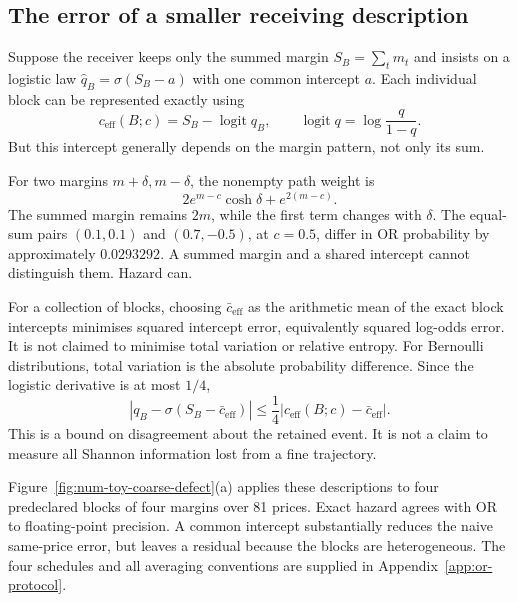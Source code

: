 \subsection{The error of a smaller receiving description}

Suppose the receiver keeps only the summed margin
\(S_B=\sum_tm_t\) and insists on a logistic law
\(\widehat q_B=\sigma(S_B-a)\) with one common intercept \(a\). Each individual block can be represented exactly using
\begin{equation}
 c_{\mathrm{eff}}(B;c)
 =S_B-\operatorname{logit}q_B,\qquad
 \operatorname{logit}q=\log\frac q{1-q}.
 \label{eq:num-toy-running-cost}
\end{equation}
But this intercept generally depends on the margin pattern, not only its sum.

For two margins \(m+\delta,m-\delta\), the nonempty path weight is
\begin{equation}
 2e^{m-c}\cosh\delta+e^{2(m-c)} .
 \label{eq:heterogeneous-pair}
\end{equation}
The summed margin remains \(2m\), while the first term changes with \(\delta\). The equal-sum pairs \((0.1,0.1)\) and \((0.7,-0.5)\), at \(c=0.5\), differ in OR probability by approximately \(0.0293292\). A summed margin and a shared intercept cannot distinguish them. Hazard can.

For a collection of blocks, choosing
\(\bar c_{\mathrm{eff}}\) as the arithmetic mean of the exact block intercepts minimises squared intercept error, equivalently squared log-odds error. It is not claimed to minimise total variation or relative entropy. For Bernoulli distributions, total variation is the absolute probability difference. Since the logistic derivative is at most \(1/4\),
\begin{equation}
 |q_B-\sigma(S_B-\bar c_{\mathrm{eff}})|
 \leq \frac14|c_{\mathrm{eff}}(B;c)-\bar c_{\mathrm{eff}}|.
 \label{eq:tv-bound}
\end{equation}
This is a bound on disagreement about the retained event. It is not a claim to measure all Shannon information lost from a fine trajectory.

Figure~\ref{fig:num-toy-coarse-defect}(a) applies these descriptions to four predeclared blocks of four margins over 81 prices. Exact hazard agrees with OR to floating-point precision. A common intercept substantially reduces the naive same-price error, but leaves a residual because the blocks are heterogeneous. The four schedules and all averaging conventions are supplied in Appendix~\ref{app:or-protocol}.

